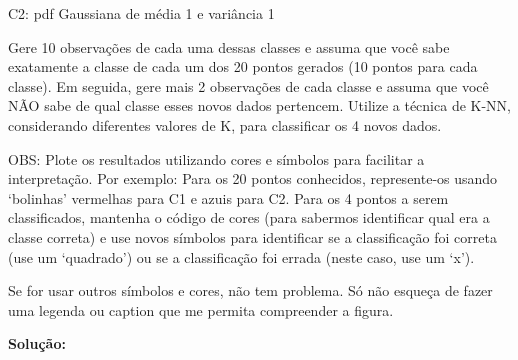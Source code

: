 \begin{enumerate}[label=E\arabic*]
C2: pdf Gaussiana de média 1 e variância 1

Gere 10 observações de cada uma dessas classes e assuma que você sabe exatamente a classe de cada um dos 20 pontos gerados (10 pontos para cada classe). Em seguida, gere mais 2 observações de cada classe e assuma que você NÃO sabe de qual classe esses novos dados pertencem. Utilize a técnica de K-NN, considerando diferentes valores de K, para classificar os 4 novos dados.

OBS: Plote os resultados utilizando cores e símbolos para facilitar a interpretação. Por exemplo: Para os 20 pontos conhecidos, represente-os usando `bolinhas' vermelhas para C1 e azuis para C2. Para os 4 pontos a serem classificados, mantenha o código de cores (para sabermos identificar qual era a classe correta) e use novos símbolos para identificar se a classificação foi correta (use um `quadrado') ou se a classificação foi errada (neste caso, use um `x').

Se for usar outros símbolos e cores, não tem problema. Só não esqueça de fazer uma
legenda ou caption que me permita compreender a figura.


\par
\textbf{Solução:}





\end{enumerate}